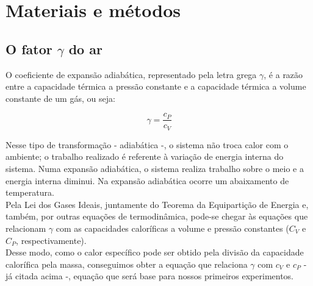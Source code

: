 \newpage
\section{Materiais e métodos}

\subsection{O fator $\gamma$ do ar}

O coeficiente de expansão adiabática, representado pela letra grega $\gamma$, é a razão entre a capacidade térmica a pressão constante e a capacidade térmica a volume constante de um gás, ou seja:

\[ \gamma = \frac{c_P}{c_V} \]

Nesse tipo de transformação - adiabática -, o sistema não troca calor com o ambiente; o trabalho realizado é referente à variação de energia interna do sistema. Numa expansão adiabática, o sistema realiza trabalho sobre o meio e a energia interna diminui. Na expansão adiabática ocorre um abaixamento de temperatura.\\

Pela Lei dos Gases Ideais, juntamente do Teorema da Equipartição de Energia e, também, por outras equações de termodinâmica, pode-se chegar às equações que relacionam $\gamma$ com as capacidades caloríficas a volume e pressão constantes ($C_V$ e $C_P$, respectivamente).\\

Desse modo, como o calor específico pode ser obtido pela divisão da capacidade calorífica pela massa, conseguimos obter a equação que relaciona $\gamma$ com $c_V$ e $c_P$ - já citada acima -, equação que será base para nossos primeiros experimentos.






